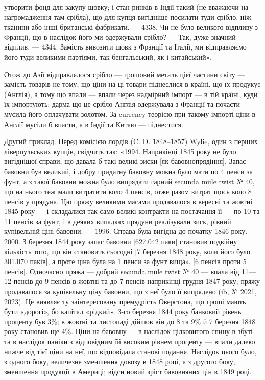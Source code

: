\parcont{}  %
утворити фонд для закупу шовку; і стан ринків в Індії такий (не вважаючи на
нагромадження там срібла), що для купця вигідніше посилати туди срібло, ніж
тканини або інші британські фабрикати. — 4338. Чи не було великого відпливу
з Франції, що в наслідок його ми одержували срібло? — Так, дуже значний відплив.
— 4344. Замість вивозити шовк з Франції та Італії, ми відправляємо його
туди великими партіями, так бенгальський, як і китайський».

Отож до Азії відправлялося срібло — грошовий металь цієї частини світу —
замість товарів не тому, що ціни на ці товари піднеслися в країні, що їх продукує
(Англія), а тому що впали — впали через надмірний імпорт — в тій країні,
куди їх імпортують; дарма що це срібло Англія одержувала з Франції та почасти
мусила його оплачувати золотом. За currency-теорією при такому імпорті
ціни в Англії мусіли б впасти, а в Індії та Китаю — піднестися.

Другий приклад. Перед комісією лордів (C. D. 1848--1857) Wylie, один
з    перших ліверпульських купців, свідчить так: «1994. Наприкінці 1845 року
не було вигіднішої справи, що давала б такі великі зиски [як бавовнопрядіння].
Запас бавовни був великий, і добру придатну бавовну можна було мати по
4    пенси за фунт, а з такої бавовни можна було випрядати гарний secunda
mule twist № 40, що на нього теж мали витратити коло 4 пенсів, отже разом
витрат щось коло 8 пенсів у прядуна. Цю пряжу великими масами продавалося
в вересні та жовтні 1845 року — і складалися так само великі контракти на
постачання її — по 10 та 11 пенсів за фунт, і в деяких випадках прядуни
реалізували зиск, рівний купівельній ціні бавовни. — 1996. Справа була вигідна
до початку 1846 року. — 2000. З березня 1844 року запас бавовни [627.042 паки]
становив подвійну кількість того, що він становить сьогодні [7 березня 1848 року,
коли його було 301.070 паків], а проте ціна була на 1 пенси за фунт вища».
[6 пенсів проти 5 пенсів]. Одночасно пряжа — добрий secunda mule twist
№ 40 — впала від 11—12 пенсів до 9 пенсів в жовтні та до 7 пенсів
наприкінці грудня 1847 року; пряжу продавалося за купівельну ціну бавовни,
що з неї було її випрядено (ib, № 2021, 2023). Це виявляє ту заінтересовану
премудрість Оверстона, що гроші мають бути «дорогі», бо капітал «рідкий». 3-го березня
1844 року банковий рівень проценту був 3\%; в жовтні та листопаді
дійшов він до 8 та 9\% й 7 березня 1848 року становив ще 4\%. Ціни на бавовну
— в наслідок цілковитого спину в збуті та в наслідок паніки з відповідним
їй високим рівнем проценту — впали далеко нижче від тієї ціни на неї,
що відповідала станові подання. Наслідок цього було, з одного боку, величезне
зменшення довозу в 1848 році, а з другого боку, зменшення продукції в Америці;
відси новий зріст бавовняних цін в 1849 році.

